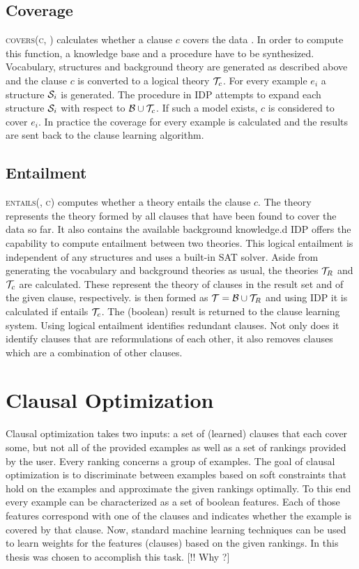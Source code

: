 \subsection{Coverage}
\textsc{covers(c, )} calculates whether a clause $c$ covers the data .
In order to compute this function, a knowledge base and a procedure have to be synthesized.
Vocabulary, structures and background theory are generated as described above and the clause $c$ is converted to a logical theory $\mathcal{T}_c$.
For every example $e_i$ a structure $\mathcal{S}_i$ is generated.
The procedure in IDP attempts to expand each structure $\mathcal{S}_i$ with respect to $\mathcal{B} \cup \mathcal{T}_c$.
If such a model exists, $c$ is considered to cover $e_i$.
In practice the coverage for every example is calculated and the results are sent back to the clause learning algorithm.

\subsection{Entailment}
\textsc{entails(, c)} computes whether a theory  entails the clause $c$.
The theory  represents the theory formed by all clauses that have been found to cover the data so far.
It also contains the available background knowledge.d
IDP offers the capability to compute entailment between two theories.
This logical entailment is independent of any structures and uses a built-in SAT solver.
Aside from generating the vocabulary and background theories as usual, the theories $\mathcal{T}_R$ and $\mathcal{T}_c$ are calculated.
These represent the theory of clauses in the result set and of the given clause, respectively.
 is then formed as $\mathcal{T} = \mathcal{B} \cup \mathcal{T}_R$ and using IDP it is calculated if  entails $\mathcal{T}_c$.
The (boolean) result is returned to the clause learning system.
Using logical entailment identifies redundant clauses.
Not only does it identify clauses that are reformulations of each other, it also removes clauses which are a combination of other clauses.

\section{Clausal Optimization}
Clausal optimization takes two inputs: a set of (learned) clauses that each cover some, but not all of the provided examples as well as a set of rankings provided by the user.
Every ranking concerns a group of examples.
The goal of clausal optimization is to discriminate between examples based on soft constraints that hold on the examples and approximate the given rankings optimally.
To this end every example can be characterized as a set of boolean features.
Each of those features correspond with one of the clauses and indicates whether the example is covered by that clause.
Now, standard machine learning techniques can be used to learn weights for the features (clauses) based on the given rankings.
In this thesis \svm{} was chosen to accomplish this task.
[!! Why \svm{}?]

